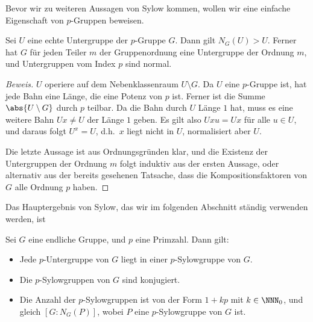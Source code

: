 \documentclass[12pt,a4paper,twoside]{article}
\begin{document}
Bevor wir zu weiteren Aussagen von Sylow kommen, wollen wir eine einfache
Eigenschaft von $p$-Gruppen beweisen.
\begin{Lemma}\label{L:p-GruppeIndp}
  Sei $U$ eine echte Untergruppe der $p$-Gruppe $G$. Dann gilt
  $N_G(U)>U$. Ferner hat $G$ f\"ur jeden Teiler $m$ der Gruppenordnung eine
  Untergruppe der Ordnung $m$, und Untergruppen vom Index $p$ sind normal.
\end{Lemma}
\begin{proof}[Beweis]
  $U$ operiere auf dem Nebenklassenraum $U\setminus G$. Da $U$ eine $p$-Gruppe
  ist, hat jede Bahn eine L\"ange, die eine Potenz von $p$ ist. Ferner ist die
  Summe $\abs{U\setminus G}$ durch $p$ teilbar. Da die Bahn durch $U$ L\"ange
  $1$ hat, muss es eine weitere Bahn $Ux\ne U$ der L\"ange $1$ geben. Es gilt
  also $Uxu=Ux$ f\"ur alle $u\in U$, und daraus folgt $U^x=U$, d.h.\ $x$ liegt
  nicht in $U$, normalisiert aber $U$.
  
  Die letzte Aussage ist aus Ordnungsgr\"unden klar, und die Existenz der
  Untergruppen der Ordnung $m$ folgt induktiv aus der ersten Aussage, oder
  alternativ aus der bereits gesehenen Tatsache, dass die Kompositionsfaktoren
  von $G$ alle Ordnung $p$ haben.
\end{proof}
Das Hauptergebnis von Sylow, das wir im folgenden Abschnitt st\"andig
verwenden werden, ist
\begin{Satz}[Sylow]\label{S:Sylow2}
  Sei $G$ eine endliche Gruppe, und $p$ eine Primzahl. Dann gilt:
  \begin{itemize}
  \item[(a)] Jede $p$-Untergruppe von $G$ liegt in einer $p$-Sylowgruppe von
  $G$.
\item[(b)] Die $p$-Sylowgruppen von $G$ sind konjugiert.
\item[(c)] Die Anzahl der $p$-Sylowgruppen ist von der Form $1+kp$ mit
  $k\in\NNN_0$, und gleich $[G:N_G(P)]$, wobei $P$ eine $p$-Sylowgruppe von
  $G$ ist.
  \end{itemize}
\end{Satz}
\end{document}
